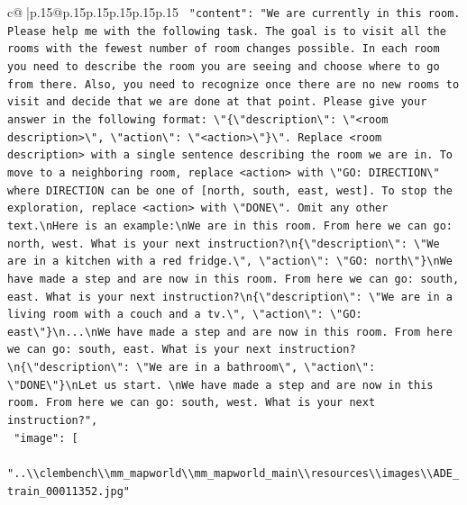 \documentclass{article}
\begin{document}
{\begin{supertabular}{c@{$\;$}|p{.15\linewidth}@{}p{.15\linewidth}p{.15\linewidth}p{.15\linewidth}p{.15\linewidth}p{.15\linewidth}}
{{{\texttt{    "content": "We are currently in this room. Please help me with the following task. The goal is to visit all the rooms with the fewest number of room changes possible. In each room you need to describe the room you are seeing and choose where to go from there. Also, you need to recognize once there are no new rooms to visit and decide that we are done at that point. Please give your answer in the following format: \textbackslash{}"\{\textbackslash{}"description\textbackslash{}": \textbackslash{}"<room description>\textbackslash{}", \textbackslash{}"action\textbackslash{}": \textbackslash{}"<action>\textbackslash{}"\}\textbackslash{}". Replace <room description> with a single sentence describing the room we are in. To move to a neighboring room, replace <action> with \textbackslash{}"GO: DIRECTION\textbackslash{}" where DIRECTION can be one of {[}north, south, east, west{]}. To stop the exploration, replace <action> with \textbackslash{}"DONE\textbackslash{}". Omit any other text.\textbackslash{}nHere is an example:\textbackslash{}nWe are in this room. From here we can go: north, west. What is your next instruction?\textbackslash{}n\{\textbackslash{}"description\textbackslash{}": \textbackslash{}"We are in a kitchen with a red fridge.\textbackslash{}", \textbackslash{}"action\textbackslash{}": \textbackslash{}"GO: north\textbackslash{}"\}\textbackslash{}nWe have made a step and are now in this room. From here we can go: south, east. What is your next instruction?\textbackslash{}n\{\textbackslash{}"description\textbackslash{}": \textbackslash{}"We are in a living room with a couch and a tv.\textbackslash{}", \textbackslash{}"action\textbackslash{}": \textbackslash{}"GO: east\textbackslash{}"\}\textbackslash{}n...\textbackslash{}nWe have made a step and are now in this room. From here we can go: south, east. What is your next instruction?\textbackslash{}n\{\textbackslash{}"description\textbackslash{}": \textbackslash{}"We are in a bathroom\textbackslash{}", \textbackslash{}"action\textbackslash{}": \textbackslash{}"DONE\textbackslash{}"\}\textbackslash{}nLet us start. \textbackslash{}nWe have made a step and are now in this room. From here we can go: south, west. What is your next instruction?",} \\
\texttt{    "image": {[}} \\
\texttt{      "..\textbackslash{}\textbackslash{}clembench\textbackslash{}\textbackslash{}mm\_mapworld\textbackslash{}\textbackslash{}mm\_mapworld\_main\textbackslash{}\textbackslash{}resources\textbackslash{}\textbackslash{}images\textbackslash{}\textbackslash{}ADE\_train\_00011352.jpg"} \\
}}}
\end{supertabular}}
\end{document}
